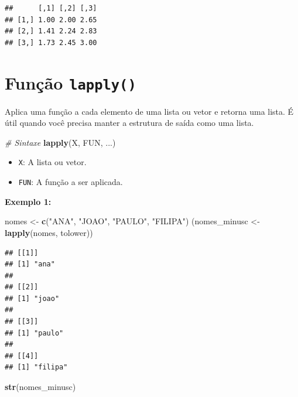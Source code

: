 \documentclass[
]{book}
\newenvironment{Shaded}{\begin{snugshade}}{\end{snugshade}}
\newcommand{\CommentTok}[1]{\textcolor[rgb]{0.56,0.35,0.01}{\textit{#1}}}
\newcommand{\FunctionTok}[1]{\textcolor[rgb]{0.13,0.29,0.53}{\textbf{#1}}}
\newcommand{\NormalTok}[1]{#1}
\newcommand{\OtherTok}[1]{\textcolor[rgb]{0.56,0.35,0.01}{#1}}
\newcommand{\StringTok}[1]{\textcolor[rgb]{0.31,0.60,0.02}{#1}}
\theoremstyle{definition}
\theoremstyle{definition}
\theoremstyle{definition}
\theoremstyle{definition}
\theoremstyle{remark}
\begin{document}
\begin{verbatim}
##      [,1] [,2] [,3]
## [1,] 1.00 2.00 2.65
## [2,] 1.41 2.24 2.83
## [3,] 1.73 2.45 3.00
\end{verbatim}

\section{\texorpdfstring{Função \texttt{lapply()}}{Função lapply()}}\label{funuxe7uxe3o-lapply}

Aplica uma função a cada elemento de uma lista ou vetor e retorna uma lista. É útil quando você precisa manter a estrutura de saída como uma lista.

\begin{Shaded}
\begin{Highlighting}[]
\CommentTok{\# Sintaxe}
\FunctionTok{lapply}\NormalTok{(X, FUN, ...)}
\end{Highlighting}
\end{Shaded}

\begin{itemize}
\item
  \texttt{X}: A lista ou vetor.
\item
  \texttt{FUN}: A função a ser aplicada.
\end{itemize}

\textbf{Exemplo 1:}

\begin{Shaded}
\begin{Highlighting}[]
\NormalTok{nomes }\OtherTok{\textless{}{-}} \FunctionTok{c}\NormalTok{(}\StringTok{"ANA"}\NormalTok{, }\StringTok{"JOAO"}\NormalTok{, }\StringTok{"PAULO"}\NormalTok{, }\StringTok{"FILIPA"}\NormalTok{)}
\NormalTok{(nomes\_minusc }\OtherTok{\textless{}{-}} \FunctionTok{lapply}\NormalTok{(nomes, tolower))}
\end{Highlighting}
\end{Shaded}

\begin{verbatim}
## [[1]]
## [1] "ana"
## 
## [[2]]
## [1] "joao"
## 
## [[3]]
## [1] "paulo"
## 
## [[4]]
## [1] "filipa"
\end{verbatim}

\begin{Shaded}
\begin{Highlighting}[]
\FunctionTok{str}\NormalTok{(nomes\_minusc) }
\end{Highlighting}
\end{Shaded}
\end{document}
